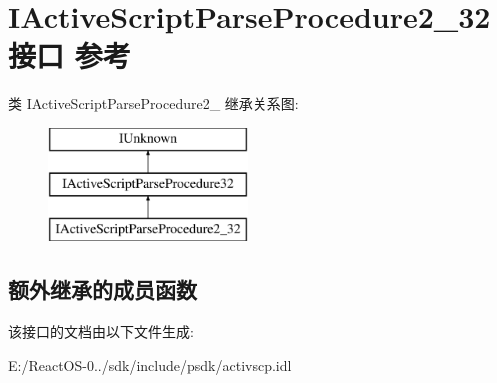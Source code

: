 \hypertarget{interface_i_active_script_parse_procedure2__32}{}\section{I\+Active\+Script\+Parse\+Procedure2\+\_\+32接口 参考}
\label{interface_i_active_script_parse_procedure2__32}
类 I\+Active\+Script\+Parse\+Procedure2\+\_ 继承关系图\+:\begin{figure}[H]
\begin{center}
\leavevmode
\includegraphics[height=3.000000cm]{interface_i_active_script_parse_procedure2__32}
\end{center}
\end{figure}
\subsection*{额外继承的成员函数}


该接口的文档由以下文件生成\+:\begin{DoxyCompactItemize}
\item 
E\+:/\+React\+O\+S-\/0../sdk/include/psdk/activscp.\+idl\end{DoxyCompactItemize}
